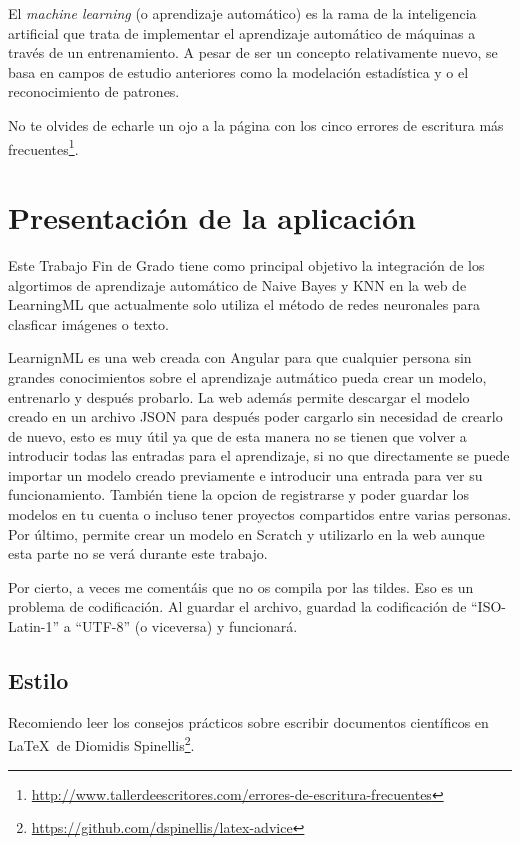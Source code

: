 \documentclass[a4paper, 12pt]{book}
\begin{document}
El \emph{machine learning} (o aprendizaje automático) es la rama de la inteligencia artificial que trata de implementar el aprendizaje automático de máquinas a través de un entrenamiento. A pesar de ser un concepto relativamente nuevo, se basa en campos de estudio anteriores como la modelación estadística y o el reconocimiento de patrones.

No te olvides de echarle un ojo a la página con los cinco errores de escritura más frecuentes\footnote{\url{http://www.tallerdeescritores.com/errores-de-escritura-frecuentes}}.

\section{Presentación de la aplicación}
\label{sec:presentacionaplicacion}

Este Trabajo Fin de Grado tiene como principal objetivo la integración de los algortimos de aprendizaje automático de Naive Bayes y KNN en la web de LearningML que actualmente solo utiliza el método de redes neuronales para clasficar imágenes o texto.

LearnignML es una web creada con Angular para que cualquier persona sin grandes conocimientos sobre el aprendizaje autmático pueda crear un modelo, entrenarlo y después probarlo. La web además permite descargar el modelo creado en un archivo JSON para después poder cargarlo sin necesidad de crearlo de nuevo, esto es muy útil ya que de esta manera no se tienen que volver a introducir todas las entradas para el aprendizaje, si no que directamente se puede importar un modelo creado previamente e introducir una entrada para ver su funcionamiento. También tiene la opcion de registrarse y poder guardar los modelos en tu cuenta o incluso tener proyectos compartidos entre varias personas. Por último, permite crear un modelo en Scratch y utilizarlo en la web aunque esta parte no se verá durante este trabajo.


Por cierto, a veces me comentáis que no os compila por las tildes.
Eso es un problema de codificación.
Al guardar el archivo, guardad la codificación de ``ISO-Latin-1'' a ``UTF-8'' (o viceversa) y funcionará.

\subsection{Estilo}
\label{subsec:estilo}

Recomiendo leer los consejos prácticos sobre escribir documentos científicos en \LaTeX \ de Diomidis Spinellis\footnote{\url{https://github.com/dspinellis/latex-advice}}.
\end{document}
